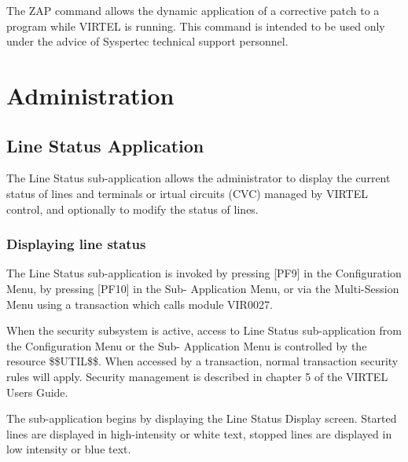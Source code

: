 \documentclass[letterpaper,10pt,english]{sphinxmanual}
\begin{document}
The ZAP command allows the dynamic application of a corrective patch to a program while VIRTEL is running. This command is intended to be used only under the advice of Syspertec technical support personnel.


\chapter{Administration}
\label{\detokenize{audit_operations_ and_performance:administration}}\label{\detokenize{audit_operations_ and_performance:index-34}}

\section{Line Status Application}
\label{\detokenize{audit_operations_ and_performance:line-status-application}}\label{\detokenize{audit_operations_ and_performance:index-35}}
The Line Status sub-application allows the administrator to display the current status of lines and terminals or irtual circuits (CVC) managed by VIRTEL control, and optionally to modify the status of lines.


\subsection{Displaying line status}
\label{\detokenize{audit_operations_ and_performance:displaying-line-status}}\label{\detokenize{audit_operations_ and_performance:index-36}}
The Line Status sub-application is invoked by pressing {[}PF9{]} in the Configuration Menu, by pressing {[}PF10{]} in the Sub- Application Menu, or via the Multi-Session Menu using a transaction which calls module VIR0027.

When the security subsystem is active, access to Line Status sub-application from the Configuration Menu or the Sub- Application Menu is controlled by the resource \$\$UTIL\$\$.
When accessed by a transaction, normal transaction security rules will apply. Security management is described in chapter 5 of the VIRTEL Users Guide.

The sub-application begins by displaying the Line Status Display screen. Started lines are displayed in high-intensity or white text, stopped lines are displayed in low intensity or blue text.
\end{document}
